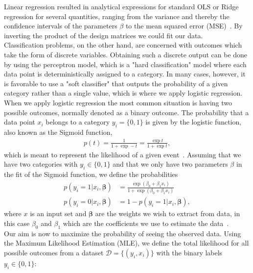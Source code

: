 \documentclass[english,notitlepage,reprint,nofootinbib]{revtex4-2}  %
\begin{document}
Linear regression resulted in analytical expressions for standard OLS or Ridge regression for several quantities, ranging from the variance and thereby the confidence intervals of the parameters $\beta$ to the mean squared error (MSE)~\cite{lecture_notes}. By inverting the product of the design matrices we could fit our data. 
\vspace{3mm}
\\
Classification problems, on the other hand, are concerned with outcomes which take the form of discrete variables. 
Obtaining such a discrete output can be done by using the perceptron model, which is a "hard classification" model where each data point is deterministically assigned to a category. In many cases, however, it is favorable to use a "soft classifier" that outputs the probability of a given category rather than a single value, which is where we apply logistic regression. 
\vspace{3mm}
\\
When we apply logistic regression the most common situation is having two possible outcomes, normally denoted as a binary outcome. 
The probability that a data point $x_i$ belongs to a category $y_i = \{0,1\}$ is given by the logistic function, also known as the Sigmoid function, 
\begin{align}\label{eq: logistic_function} %
    p(t) = \frac{1}{1+\exp -t} = \frac{\exp t}{1+\exp t}, 
\end{align}
which is meant to represent the likelihood of a given event~\cite{friedman}. 
Assuming that we have two categories with $y_i\in\{0,1\}$ and that we only have two parameters $\beta$ in the fit of the Sigmoid function, we define the probabilities 
\begin{align}
    p(y_i=1 | x_i,\boldsymbol{\beta}) &= 
    \frac{\exp(\beta_0 + \beta_1 x_i)}
    {1 + \exp(\beta_0 + \beta_1 x_i)} \\ 
    p(y_i=0 | x_i,\boldsymbol{\beta}) &= 
    1 - p(y_i=1 | x_i,\boldsymbol{\beta}) , 
\end{align}
where $x$ is an input set and $\boldsymbol{\beta}$ are the weights we wish to extract from data, in this case $\beta_0$ and $\beta_1$ which are the coefficients we use to estimate the data~\cite{friedman}. 
\vspace{3mm}
\\ 
Our aim is now to maximize the probability of seeing the observed data. 
Using the Maximum Likelihood Estimation (MLE), we define the total likelihood for all possible outcomes from a dataset $\mathcal{D} = \{(y_i,x_i)\}$ with the binary labels $y_i\in\{0,1\}$: 
\end{document}
